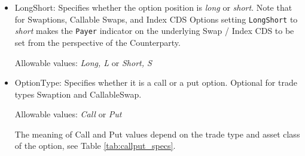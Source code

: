 \begin{itemize}
\item LongShort: Specifies whether the option position is \emph{long}  or \emph{short}.  Note that for Swaptions, Callable Swaps, and Index CDS Options setting \lstinline!LongShort! to \emph{short} makes the \lstinline!Payer! indicator on the underlying Swap / Index CDS to be set from the perspective of the Counterparty.

Allowable values: \emph{Long, L} or \emph{Short, S}

\item OptionType: Specifies whether it is a call or a put option. Optional for trade types Swaption and CallableSwap.

Allowable values: \emph{Call} or \emph{Put}

The meaning of Call and Put values depend on the trade type and asset class of the option, see Table \ref{tab:callput_specs}.


\end{itemize}
